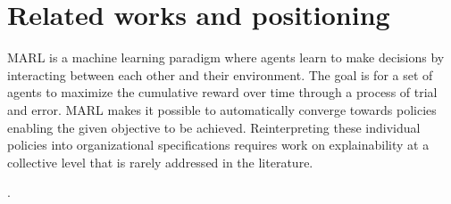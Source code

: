 \documentclass{ecai}
\begin{document}


\section{Related works and positioning}



MARL is a machine learning paradigm where agents learn to make decisions by interacting between each other and their environment. The goal is for a set of agents to maximize the cumulative reward over time through a process of trial and error.
MARL makes it possible to automatically converge towards policies enabling the given objective to be achieved. Reinterpreting these individual policies into organizational specifications requires work on explainability at a collective level that is rarely addressed in the literature.




.%
\end{document}
